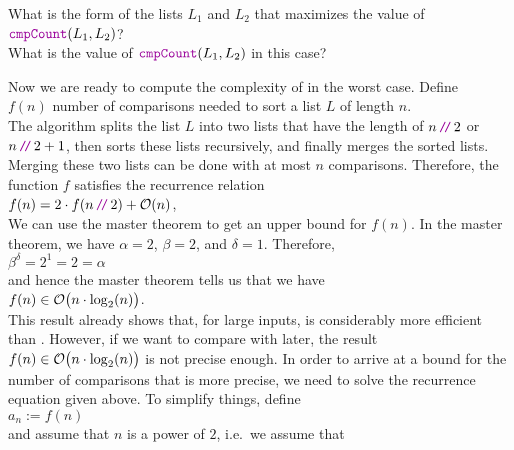 \exercise
What is the form of the lists $L_1$ and $L_2$ that maximizes the value of 
\\[0.2cm]
\hspace*{1.3cm}
$\mytt{cmpCount}(L_1, L_2)$?
\\[0.2cm]
What is the value of $\mytt{cmpCount}(L_1, L_2)$ in this case? \eox
\vspace*{0.3cm}

\noindent
Now we are ready to compute the complexity of  in the worst case.  Define
\\[0.2cm]
\hspace*{1.3cm}
$f(n)$  \mytt{:=} number of comparisons needed to sort a list $L$ of length $n$.
\\[0.2cm]
The algorithm  
splits the list $L$ into two lists that have the length of $n\dv 2$ or $n\dv 2+1$, then sorts
these lists recursively, and finally merges the sorted lists.  Merging these two lists can be done with
at most $n$ comparisons.  Therefore, the function $f$ satisfies the recurrence relation
\\[0.2cm]
\hspace*{1.3cm}
$f(n) = 2 \cdot f(n \dv  2) + \Oh(n)$,
\\[0.2cm]
We can use the master theorem to get an upper bound for $f(n)$.  In the master theorem, we have
$\alpha = 2$, $\beta = 2$, and $\delta = 1$. Therefore,
\\[0.2cm]
\hspace*{1.3cm}
$\beta^\delta = 2^1 = 2 = \alpha$
\\[0.2cm]
and hence the master theorem tells us that we have
\\[0.2cm]
\hspace*{1.3cm}
$f(n) \in \mathcal{O}\bigl(n \cdot \log_2(n) \bigr)$.
\\[0.2cm]
This result already shows that, for large inputs,  is considerably more efficient
than .  However, if we want to compare
 with  later, the result $f(n) \in \mathcal{O}\bigl(n \cdot \log_2(n) \bigr)$ is
not precise enough.  In order to arrive at a bound for the number of comparisons that is more precise,
we need to solve the recurrence equation given above.  To simplify things,  define
\\[0.2cm]
\hspace*{1.3cm}
$a_n := f(n)$ 
\\[0.2cm]
and assume that $n$ is a power of $2$, i.e.~we assume that
\\[0.2cm]

